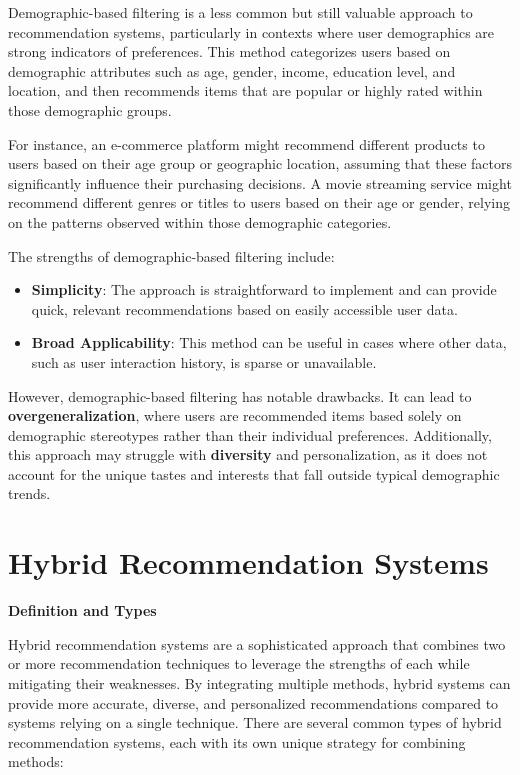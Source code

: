 \documentclass{article}
\begin{document}
Demographic-based filtering is a less common but still valuable approach to recommendation systems, particularly in contexts where user demographics are strong indicators of preferences. This method categorizes users based on demographic attributes such as age, gender, income, education level, and location, and then recommends items that are popular or highly rated within those demographic groups.

For instance, an e-commerce platform might recommend different products to users based on their age group or geographic location, assuming that these factors significantly influence their purchasing decisions. A movie streaming service might recommend different genres or titles to users based on their age or gender, relying on the patterns observed within those demographic categories.

The strengths of demographic-based filtering include:

\begin{itemize}
    \item \textbf{Simplicity}: The approach is straightforward to implement and can provide quick, relevant recommendations based on easily accessible user data.
    \item \textbf{Broad Applicability}: This method can be useful in cases where other data, such as user interaction history, is sparse or unavailable.
\end{itemize}

However, demographic-based filtering has notable drawbacks. It can lead to \textbf{overgeneralization}, where users are recommended items based solely on demographic stereotypes rather than their individual preferences. Additionally, this approach may struggle with \textbf{diversity} and personalization, as it does not account for the unique tastes and interests that fall outside typical demographic trends.

\section{Hybrid Recommendation Systems}

\textbf{Definition and Types}

Hybrid recommendation systems are a sophisticated approach that combines two or more recommendation techniques to leverage the strengths of each while mitigating their weaknesses. By integrating multiple methods, hybrid systems can provide more accurate, diverse, and personalized recommendations compared to systems relying on a single technique. There are several common types of hybrid recommendation systems, each with its own unique strategy for combining methods:
\end{document}
